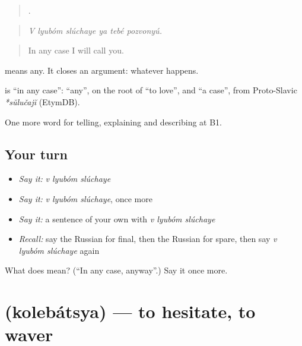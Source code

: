 \begin{quote}
     .
\end{quote}

\begin{quote}
\emph{V lyubóm slúchaye ya tebé pozvonyú.}
\end{quote}

\begin{quote}
In any case I will call you.
\end{quote}

\emph{} means any. It closes an argument: whatever happens.

\begin{cousinweb}
\textbf{  } is \textquotedblleft{}in any case\textquotedblright{}: \emph{} \textquotedblleft{}any\textquotedblright{}, on the root of \emph{} \textquotedblleft{}to love\textquotedblright{}, and \emph{} \textquotedblleft{}a case\textquotedblright{}, from Proto-Slavic \emph{*sŭlučajĭ} (EtymDB).
\end{cousinweb}

\begin{grammarlens}[title={What you've built}]
One more word for telling, explaining and describing at B1.
\end{grammarlens}

\subsection*{Your turn}
\begin{itemize}
\raggedright
  \item \emph{Say it:} \emph{v lyubóm slúchaye}
  \item \emph{Say it:} \emph{v lyubóm slúchaye}, once more
  \item \emph{Say it:} a sentence of your own with \emph{v lyubóm slúchaye}
  \item \emph{Recall:} say the Russian for final, then the Russian for spare, then say \emph{v lyubóm slúchaye} again
\end{itemize}

\begin{tcolorbox}[breakable,colback=teal!4,colframe=teal!35!black,title={Before you move on}]
What does    mean? (\textquotedblleft{}In any case, anyway\textquotedblright{}.) Say it once more.
\end{tcolorbox}
\section[\texorpdfstring{\ru{колебаться} (kolebátsya)}{колебаться (kolebátsya)}]{ (kolebátsya) — to hesitate, to waver}

